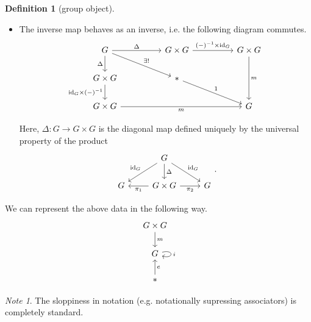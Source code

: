 \documentclass[a4paper,10pt]{scrreprt}
\theoremstyle{definition}
\newtheorem{definition}{Definition}[section]
\theoremstyle{plain}
\theoremstyle{remark}
\newtheorem{note}{Note}[section]
\begin{document}
\begin{definition}[group object]
\begin{itemize}
    \item The inverse map behaves as an inverse, i.e. the following diagram commutes.
      \begin{equation*}
        \begin{tikzcd}[column sep=huge]
          G 
          \arrow[r, "\Delta"]
          \arrow[d, swap, "\Delta"]
          \arrow[dr, "\exists!"]
          & G \times G 
          \arrow[r, "(-)^{-1} \times \mathrm{id}_{G}"]
          & G \times G
          \arrow[dd, "m"]
          \\
          G \times G
          \arrow[d, swap, "\mathrm{id}_{G} \times (-)^{-1}"]
          & *
          \arrow[dr, "1"]
          \\
          G \times G
          \arrow[rr, swap, "m"]
          & & G
        \end{tikzcd}
      \end{equation*}

      Here, $\Delta\colon G \to G \times G$ is the diagonal map defined uniquely by the universal property of the product
      \begin{equation*}
        \begin{tikzcd}
          & G
          \arrow[dr, "\mathrm{id}_{G}"]
          \arrow[dl, swap, "\mathrm{id}_{G}"]
          \arrow[d, "\Delta"]
          \\
          G 
          & G \times G
          \arrow[l, "\pi_{1}"]
          \arrow[r, swap, "\pi_{2}"]
          & G
        \end{tikzcd}.
      \end{equation*}
  \end{itemize}

  We can represent the above data in the following way.
  \begin{equation*}
    \begin{tikzcd}
      G \times G
      \arrow[d, "m"]
      \\
      G
      \arrow[loop right, "i"]
      \\
      *
      \arrow[u, swap, "e"]
    \end{tikzcd}
  \end{equation*}
\end{definition} 

\begin{note}
  The sloppiness in notation (e.g. notationally supressing associators) is completely standard.
\end{note}
\end{document}
